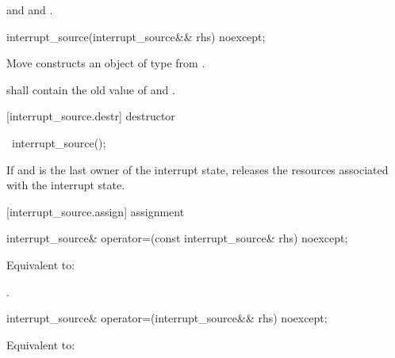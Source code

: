 {\begin{itemdescr}
  \pnum\postconditions {}
                and 
                and .
\end{itemdescr}

%
\begin{itemdecl}
interrupt_source(interrupt_source&& rhs) noexcept;
\end{itemdecl}
\begin{itemdescr}
  \pnum\effects Move constructs an object of type  from .

  \pnum\postconditions {} shall contain the old value of  and
                        .
\end{itemdescr}

[interrupt_source.destr]{ destructor}

%
\begin{itemdecl}
~interrupt_source();
\end{itemdecl}

\begin{itemdescr}
 \pnum\effects If  and  is the last owner of the interrupt state,
                releases the resources associated with the interrupt state.
\end{itemdescr}

[interrupt_source.assign]{ assignment}

%
\begin{itemdecl}
interrupt_source& operator=(const interrupt_source& rhs) noexcept;
\end{itemdecl}
\begin{itemdescr}
  \pnum\effects Equivalent to: 

  \pnum\returns {}.
\end{itemdescr}

%
\begin{itemdecl}
interrupt_source& operator=(interrupt_source&& rhs) noexcept;
\end{itemdecl}
\begin{itemdescr}
  \pnum\effects Equivalent to: 


\end{itemdescr}}
